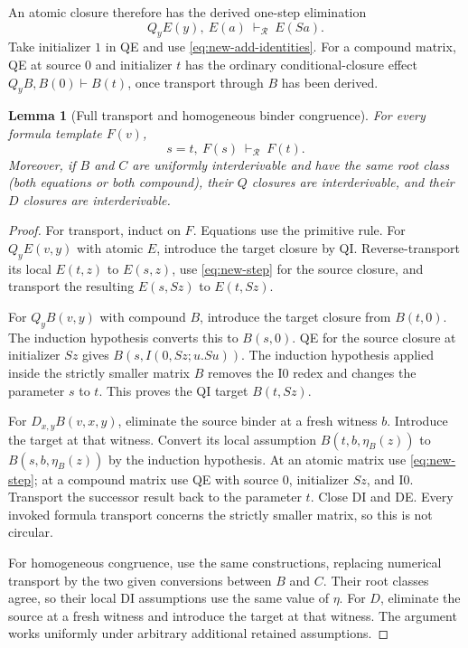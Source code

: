 \documentclass[11pt,a4paper]{article}
\newtheorem{lemma}[theorem]{Lemma}
\theoremstyle{definition}\newtheorem{definition}[theorem]{Definition}
\begin{document}
An atomic closure therefore has the derived one-step elimination
\begin{equation}
 Q_yE(y),\ E(a)\ \vdash_{\mathcal R}\ E(Sa).
 \label{eq:new-step}
\end{equation}
Take initializer $1$ in QE and use \eqref{eq:new-add-identities}.
For a compound matrix, QE at source $0$ and initializer $t$ has the ordinary
conditional-closure effect $Q_yB,B(0)\vdash B(t)$, once transport through
$B$ has been derived.

\begin{lemma}[Full transport and homogeneous binder congruence]
\label{lem:new-transport}
For every formula template $F(v)$,
\begin{equation}
 s=t,\ F(s)\ \vdash_{\mathcal R}\ F(t).
 \label{eq:new-full-tr}
\end{equation}
Moreover, if $B$ and $C$ are uniformly interderivable and have the same root
class (both equations or both compound), their $Q$ closures are
interderivable, and their $D$ closures are interderivable.
\end{lemma}
\begin{proof}
For transport, induct on $F$.  Equations use the primitive rule.  For
$Q_yE(v,y)$ with atomic $E$, introduce the target closure by QI.
Reverse-transport its local $E(t,z)$ to $E(s,z)$, use
\eqref{eq:new-step} for the source closure, and transport the resulting
$E(s,Sz)$ to $E(t,Sz)$.

For $Q_yB(v,y)$ with compound $B$, introduce the target closure from
$B(t,0)$.  The induction hypothesis converts this to $B(s,0)$.
QE for the source closure at initializer $Sz$ gives
$B(s,I(0,Sz;u.Su))$.  The induction hypothesis applied inside the strictly
smaller matrix $B$ removes the I0 redex and changes the parameter $s$ to $t$.
This proves the QI target $B(t,Sz)$.

For $D_{x,y}B(v,x,y)$, eliminate the source binder at a fresh witness $b$.
Introduce the target at that witness.  Convert its local assumption
$B(t,b,\eta_B(z))$ to $B(s,b,\eta_B(z))$ by the induction hypothesis.
At an atomic matrix use \eqref{eq:new-step}; at a compound matrix use QE
with source $0$, initializer $Sz$, and I0.  Transport the successor result
back to the parameter $t$.  Close DI and DE.  Every invoked formula
transport concerns the strictly smaller matrix, so this is not circular.

For homogeneous congruence, use the same constructions, replacing numerical
transport by the two given conversions between $B$ and $C$.  Their root
classes agree, so their local DI assumptions use the same value of $\eta$.
For $D$, eliminate the source at a fresh witness and introduce the target
at that witness.  The argument works uniformly under arbitrary additional
retained assumptions.
\end{proof}
\end{document}
